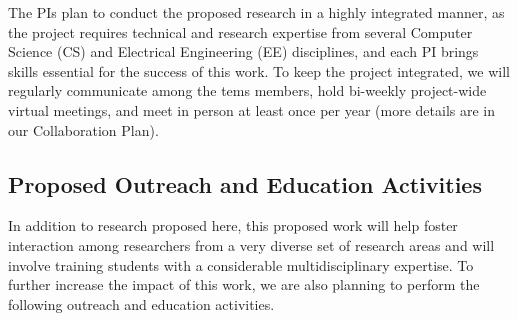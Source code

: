 \documentclass[11 pt]{article}
\begin{document}
The PIs plan to conduct the proposed research in a highly integrated manner, as the project requires technical and research expertise from several Computer Science (CS) and Electrical Engineering (EE) disciplines, and each PI brings skills essential for the success of this work. To keep the project integrated, we will regularly communicate among the tems members, hold bi-weekly project-wide virtual meetings, and meet in person at least once per year (more details are in our Collaboration Plan).

\subsection{Proposed Outreach and Education Activities}

In addition to research proposed here, this proposed work will help foster interaction among researchers from a
very diverse set of research areas and will involve training students
with a considerable multidisciplinary expertise. To further increase
the impact of this work, we are also planning to perform the following
outreach and education activities.
\end{document}

